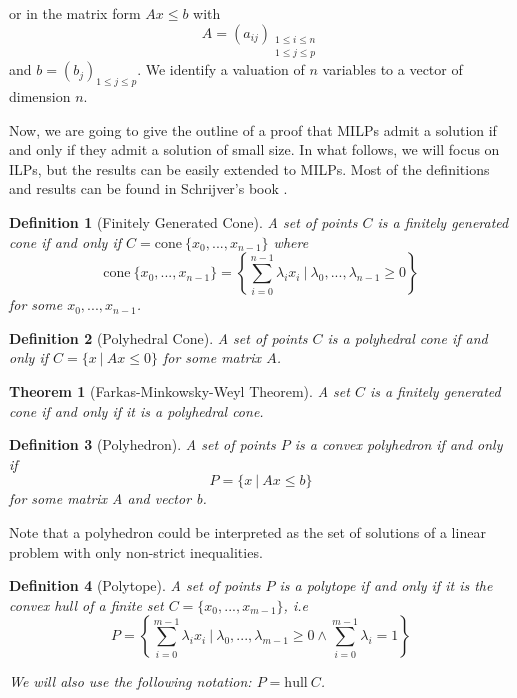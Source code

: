 \documentclass{article}
\newcommand{\cone}{\mathrm{cone}}
\newcommand{\hull}{\mathrm{hull}}
\newcommand{\ifff}{if and only if}
\newtheorem{definition}{Definition}
\newtheorem{theorem}{Theorem}
\begin{document}
or in the matrix form $Ax \leqslant b$ with
$$A = (a_{ij})_{\substack{1 \leqslant i \leqslant n \\
                          1 \leqslant j \leqslant p}}$$ and
$b = (b_j)_{1 \leqslant j \leqslant p}$. We identify a valuation of $n$
variables to a vector of dimension $n$.

Now, we are going to give the outline of a proof that MILPs admit a solution
if and only if they admit a solution of small size. In what follows, we will
focus on ILPs, but the results can be easily extended to MILPs. Most of the
definitions and results can be found in Schrijver's book
\cite[Sections 7 and 16]{Schrijver1998}.

\begin{definition}[Finitely Generated Cone]
  A set of points $C$ is a \textup{finitely generated cone}
  \ifff{} $C = \cone~\{x_0, ..., x_{n-1}\}$ where
  $$\cone~\{x_0, ..., x_{n-1}\} =
      \left\{\sum_{i=0}^{n-1} \lambda_i x_i~|~
               \lambda_0, ..., \lambda_{n-1} \geqslant 0\right\}
  $$
  for some $x_0, ..., x_{n-1}$.
\end{definition}

\begin{definition}[Polyhedral Cone]
  A set of points $C$ is a \textup{polyhedral cone}
  \ifff{} $C = \{x~|~Ax \leqslant 0\}$ for some matrix $A$.
\end{definition}

\begin{theorem}[Farkas-Minkowsky-Weyl Theorem]
  A set $C$ is a finitely generated cone \ifff{} it is a polyhedral cone.
\end{theorem}

\begin{definition}[Polyhedron]
  A set of points $P$ is a \textup{convex polyhedron} \ifff{}
  $$P = \{x~|~Ax \leqslant b\}$$
  for some matrix A and vector b.
\end{definition}

Note that a polyhedron could be interpreted as the set of solutions of a linear
problem with only non-strict inequalities.

\begin{definition}[Polytope]
  A set of points $P$ is a \textup{polytope} \ifff{} it is the convex hull of a
  finite set $C = \{x_0, ..., x_{m-1}\}$, \textit{i.e}
  $$P = \left\{
    \sum_{i=0}^{m-1} \lambda_i x_i~|~\lambda_0, ..., \lambda_{m-1} \geqslant 0
                                  \wedge \sum_{i=0}^{m-1} \lambda_i = 1
        \right\}$$

  We will also use the following notation: $P = \hull~C$.
\end{definition}
\end{document}
